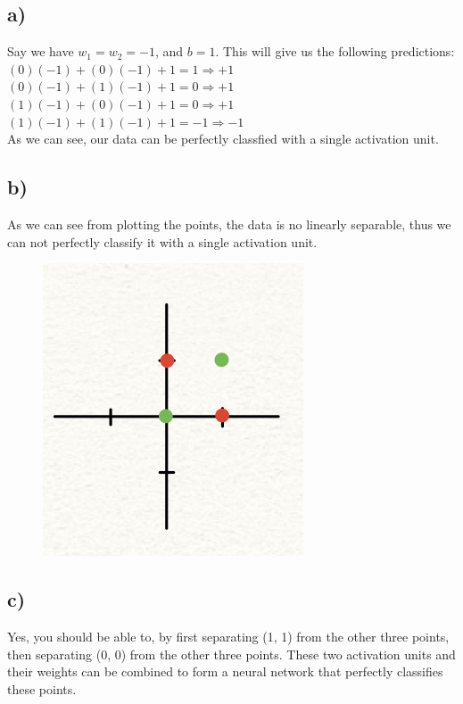 \documentclass[12pt, letterpaper]{article}
\begin{document}
\subsection*{a)} Say we have $w_1=w_2=-1$, and $b = 1$. This will give us the following predictions:\\
$(0)(-1)+(0)(-1)+1 = 1 \Rightarrow +1$\\
$(0)(-1)+(1)(-1)+1 = 0 \Rightarrow +1$\\
$(1)(-1)+(0)(-1)+1 = 0 \Rightarrow +1$\\
$(1)(-1)+(1)(-1)+1 = -1 \Rightarrow -1$\\
As we can see, our data can be perfectly classfied with a single activation unit.\\

\subsection*{b)} As we can see from plotting the points, the data is no linearly separable, thus we can not perfectly classify it with a single activation unit.
\begin{figure}[h!]
  \includegraphics[scale=0.4]{./images/6b.jpeg}
\end{figure}
\clearpage

\subsection*{c)}Yes, you should be able to, by first separating (1, 1) from the other three points, then separating (0, 0) from the other three points. These two activation units and their weights can be combined to form a neural network that perfectly classifies these points.
\end{document}
